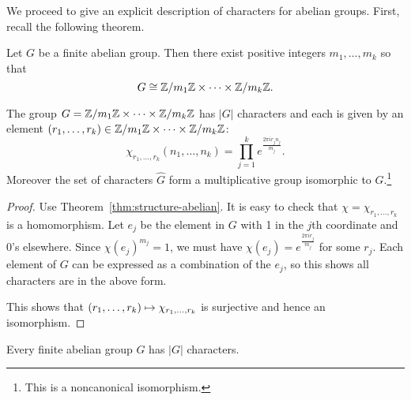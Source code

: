 We proceed to give an explicit description of characters for abelian groups. First, recall the following theorem.
\begin{thm}
Let $G$ be a finite abelian group. Then there exist positive integers $m_1,\ldots, m_k$ so that
\[G\cong \mathbb{Z}/{m_1}\mathbb{Z}\times \cdots \times \mathbb{Z}/{m_k}\mathbb{Z}.\]
\end{thm}
\begin{thm}
The group $G=\mathbb{Z}/{m_1}\mathbb{Z}\times \cdots \times \mathbb{Z}/{m_k}\mathbb{Z}$ has $|G|$ characters and each is given by an element $(r_1,\ldots, r_k)\in \mathbb{Z}/{m_1}\mathbb{Z}\times \cdots \times \mathbb{Z}/{m_k}\mathbb{Z}$:
\[\chi_{r_1,\ldots, r_k}(n_1,\ldots, n_k)=\prod_{j=1}^k e^{\frac{2\pi ir_jn_j}{m_j}}.\]
Moreover the set of characters $\widehat{G}$ form a multiplicative group isomorphic to $G$.\footnote{This is a noncanonical isomorphism.}
\end{thm}
\begin{proof}
Use Theorem~\ref{thm:structure-abelian}.
It is easy to check that $\chi=\chi_{r_1,\ldots, r_k}$ is a homomorphism. Let $e_j$ be the element in $G$ with 1 in the $j$th coordinate and 0's elsewhere. Since $\chi(e_j)^{m_j}=1$, we must have $\chi(e_j)=e^{\frac{2\pi ir_j}{m_j}}$ for some $r_j$. Each element of $G$ can be expressed as a combination of the $e_j$, so this shows all characters are in the above form.

This shows that $(r_1,\ldots, r_k)\mapsto \chi_{r_1,\ldots, r_k}$ is surjective and hence an isomorphism.
\end{proof}
\begin{cor}
Every finite abelian group $G$ has $|G|$ characters.
\end{cor}
